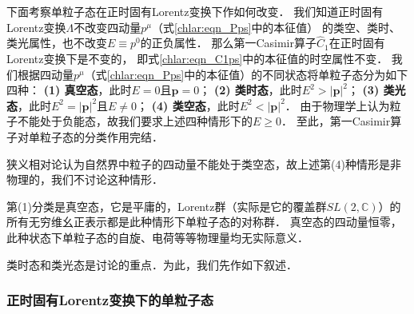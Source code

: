 下面考察单粒子态在正时固有Lorentz变换下作如何改变．
我们知道正时固有Lorentz变换$\Lambda$不改变四动量$p^\mu$（式\eqref{chlar:eqn_Pps}中的本征值）
的类空、类时、类光属性，也不改变$E\equiv p^0$的正负属性．
那么第一Casimir算子$\hat{C}_1$在正时固有Lorentz变换下是不变的，
即式\eqref{chlar:eqn_C1ps}中的本征值的时空属性不变．
我们根据四动量$p^\mu$（式\eqref{chlar:eqn_Pps}中的本征值）的不同状态将单粒子态分为如下四种：
{\heiti \bfseries (1) 真空态}，此时$E=0$且$\boldsymbol{p}=0$；
{\heiti \bfseries (2) 类时态}，此时$E^2>|\boldsymbol{p}|^2$；
{\heiti \bfseries (3) 类光态}，此时$E^2=|\boldsymbol{p}|^2$且$E \neq 0$；
{\heiti \bfseries (4) 类空态}，此时$E^2<|\boldsymbol{p}|^2$．
由于物理学上认为粒子不能处于负能态，故我们要求上述四种情形下的$E\geqslant 0$．
至此，第一Casimir算子对单粒子态的分类作用完结．

狭义相对论认为自然界中粒子的四动量不能处于类空态，故上述第(4)种情形是非物理的，我们不讨论这种情形．

第(1)分类是{\kaishu 真空态}，它是平庸的，Lorentz群（实际是它的覆盖群$SL(2,\mathbb{C})$）的
所有无穷维幺正表示都是此种情形下单粒子态的对称群．
真空态的四动量恒零，此种状态下单粒子态的自旋、电荷等等物理量均无实际意义．

{\kaishu 类时态}和{\kaishu 类光态}是讨论的重点．为此，我们先作如下叙述．

\subsubsection{正时固有Lorentz变换下的单粒子态}

